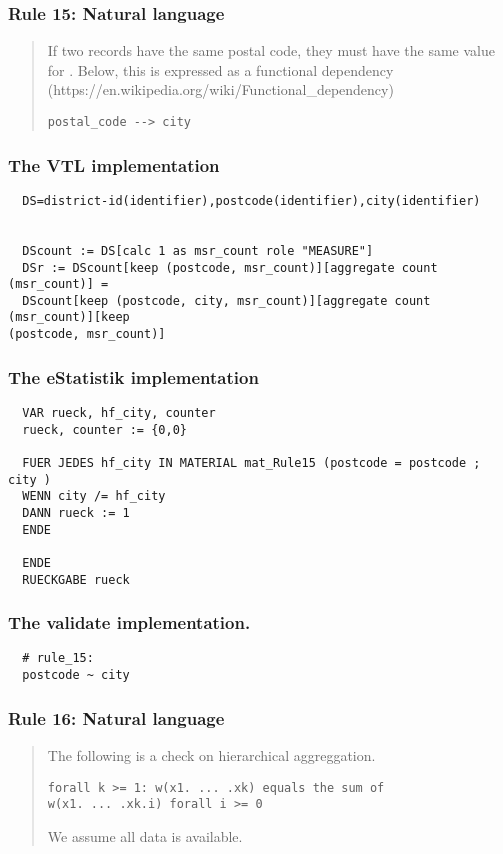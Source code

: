 \newpage

\subsubsection*{  Rule 15: Natural language}
\begin{quote}


If two records have the same postal code, they must have the same value for . Below, this is expressed
as a functional dependency (https://en.wikipedia.org/wiki/Functional\_dependency)

\begin{verbatim}
postal_code --> city
\end{verbatim}



\end{quote}
\subsubsection*{The VTL implementation}
\begin{verbatim}
  DS=district-id(identifier),postcode(identifier),city(identifier)


  DScount := DS[calc 1 as msr_count role "MEASURE"]
  DSr := DScount[keep (postcode, msr_count)][aggregate count (msr_count)] =
  DScount[keep (postcode, city, msr_count)][aggregate count (msr_count)][keep
(postcode, msr_count)]
\end{verbatim}
\subsubsection*{The eStatistik implementation}
\begin{verbatim}
  VAR rueck, hf_city, counter
  rueck, counter := {0,0}

  FUER JEDES hf_city IN MATERIAL mat_Rule15 (postcode = postcode ; city )
  WENN city /= hf_city
  DANN rueck := 1
  ENDE

  ENDE
  RUECKGABE rueck
\end{verbatim}
\subsubsection*{The validate implementation.}
\begin{verbatim}
  # rule_15:
  postcode ~ city
\end{verbatim}


\newpage

\subsubsection*{  Rule 16: Natural language}
\begin{quote}


The following is a check on hierarchical aggreggation.

\begin{verbatim}
forall k >= 1: w(x1. ... .xk) equals the sum of
w(x1. ... .xk.i) forall i >= 0
\end{verbatim}

We assume all data is available.



\end{quote}
